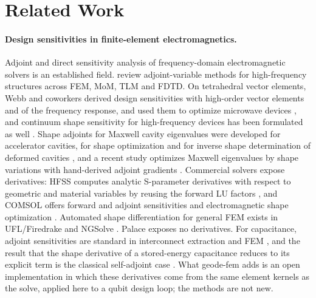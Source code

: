 \documentclass{anvil-paper}
\begin{document}
\section{Related Work}
\label{sec:related}

\paragraph{Design sensitivities in finite-element electromagnetics.}
Adjoint and direct sensitivity analysis of frequency-domain
electromagnetic solvers is an established field. \citet{nikolova2004adjoint}
review adjoint-variable methods for high-frequency structures across FEM,
MoM, TLM and FDTD. On tetrahedral vector elements, Webb and coworkers
derived design sensitivities with high-order vector elements and of the
frequency response, and used them to optimize microwave devices
\citep{webb2001design,webb2002design,nair2003optimization}, and continuum
shape sensitivity for high-frequency devices has been formulated as well
\citep{choi2011generalized}. Shape adjoints for Maxwell cavity eigenvalues
were developed for accelerator cavities, for shape optimization
\citep{akcelik2005adjoint} and for inverse shape determination of
deformed cavities \citep{akcelik2008shape}, and a recent study
optimizes Maxwell eigenvalues by shape variations with hand-derived
adjoint gradients \citep{herter2026numerical}. Commercial solvers expose
derivatives: HFSS computes analytic S-parameter derivatives with respect
to geometric and material variables by reusing the forward LU factors
\citep{ansys_hfss_derivatives,vardapetyan2008sensitivity}, and COMSOL
offers forward and adjoint sensitivities and electromagnetic shape
optimization \citep{comsol_sensitivity_method,jensen2022comsolshape}.
Automated shape differentiation for general FEM exists in UFL/Firedrake
\citep{ham2019automated} and NGSolve \citep{gangl2021fully}. Palace exposes
no derivatives. For capacitance, adjoint sensitivities are standard in
interconnect extraction \citep{elmoselhy2008efficient} and FEM
\citep{ren2012computation}, and the result that the shape derivative of a
stored-energy capacitance reduces to its explicit term is the classical
self-adjoint case \citep{park2019continuum}. What geode-fem adds is an
open implementation in which these derivatives come from the same element
kernels as the solve, applied here to a qubit design loop; the methods
are not new.
\end{document}
